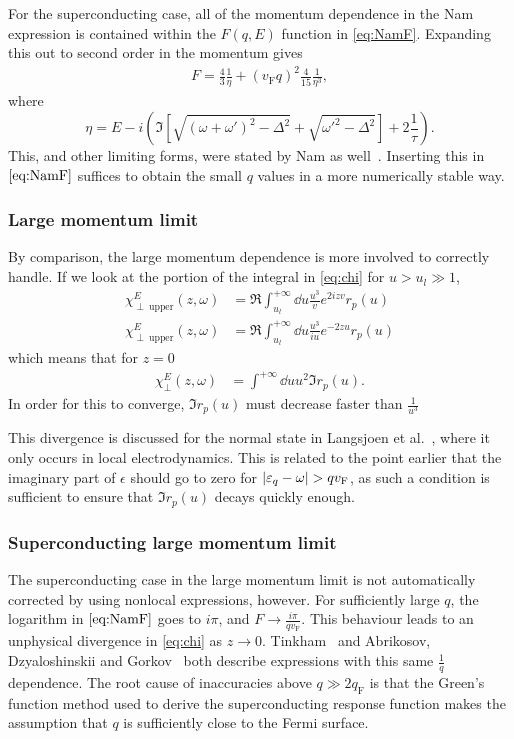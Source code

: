 \documentclass[%
 preprint,
 amsmath,amssymb,
 aps,
]{revtex4-2}
\newcommand{\vf}{v_{\mathrm{F}}}
\begin{document}
For the superconducting case, all of the momentum dependence in the Nam expression is contained within the $F(q, E)$ function in \eqref{eq:NamF}.
Expanding this out to second order in the momentum gives
\begin{align}
	F = \frac43 \frac{1}{\eta} + (\vf q)^2\frac{4}{15} \frac{1}{\eta^3},
\end{align}
where
\begin{equation}
	\eta = E - i \left(\Im[\sqrt{(\omega + \omega')^2 - \Delta^2} + \sqrt{\omega'^2 - \Delta^2}] + 2 \frac{1}{\tau} \right).
\end{equation}
This, and other limiting forms, were stated by Nam as well~\cite{Nam1967}.
Inserting this in $\eqref{eq:NamF}$ suffices to obtain the small $q$ values in a more numerically stable way.

\subsubsection{Large momentum limit} \label{subsubsec:bigq}
By comparison, the large momentum dependence is more involved to correctly handle.
If we look at the portion of the integral in \eqref{eq:chi} for $u > u_l \gg 1$,
\begin{align}
	\chi_{\perp\ \mathrm{upper}}^E(z, \omega) &= \Re \int_{u_l}^{+\infty} \dd{u} \frac{u^3}{v} e^{2 i z v} r_p(u) \\
	\chi_{\perp\ \mathrm{upper}}^E(z, \omega) &= \Re \int_{u_l}^{+\infty} \dd{u} \frac{u^3}{i u} e^{-2 z u} r_p(u)
\end{align}
which means that for $z = 0$
\begin{align}
	\chi_\perp^E(z, \omega) &= \int^{+\infty} \dd{u} u^2 \Im r_p(u).
\end{align}
In order for this to converge, $\Im r_p(u)$ must decrease faster than $\frac{1}{u^3}$

This divergence is discussed for the normal state in Langsjoen et al.~\cite{QubitRelax}, where it only occurs in local electrodynamics.
This is related to the point earlier that the imaginary part of $\epsilon$ should go to zero for $\abs{\varepsilon_q - \omega} > q \vf$, as such a condition is sufficient to ensure that $\Im r_p(u)$ decays quickly enough.

\subsubsection{Superconducting large momentum limit} \label{subsubsec:scbigq}
The superconducting case in the large momentum limit is not automatically corrected by using nonlocal expressions, however.
For sufficiently large $q$, the logarithm in $\eqref{eq:NamF}$ goes to $i \pi$, and $F \rightarrow \frac{i \pi}{q \vf}$.
This behaviour leads to an unphysical divergence in \eqref{eq:chi} as $z \rightarrow 0$.
Tinkham~\cite{Tinkham} and Abrikosov, Dzyaloshinskii and Gorkov~\cite{AGD} both describe expressions with this same $\frac{1}{q}$ dependence.
The root cause of inaccuracies above $q \gg 2 q_{\mathrm{F}}$ is that the Green's function method used to derive the superconducting response function makes the assumption that $q$ is sufficiently close to the Fermi surface.
\end{document}
